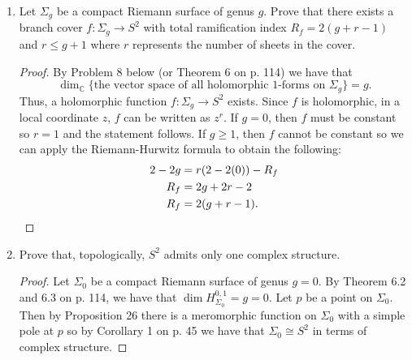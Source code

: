 \documentclass[11pt,oneside,english,reqno]{amsart}
\theoremstyle{definition}
\newcommand{\MB}[1]{\mathbb{#1}}
\begin{document}
\begin{enumerate}[leftmargin=*]
\begin{enumerate}
\item Prove that there exists a nontrivial meromorphic 1-form on $X$.

\begin{proof}
By the result in part (a), we have a meromorphic function $f$ on $X$ and so $\bar\partial f$ is a meromorphic (0,1)-form. By Problem 8 below (Theorem 6 on p. 114), $\bar\partial f$ is a meromorphic 1-form. This must be nontrivial since otherwise $f$ would be trivial and we would have
\[
h=\sum_{i=1}^{g+1}\beta_i\cdot\frac{1}{z}
\]
which is a contradiction since $h$ is smooth.
\end{proof}
\end{enumerate}



\item Let $\Sigma_g$ be a compact Riemann surface of genus $g$. Prove that there exists a branch cover $f:\Sigma_g\to S^2$ with total ramification index $R_f=2(g+r-1)$ and $r\leq g+1$ where $r$ represents the number of sheets in the cover.

\begin{proof}
By Problem 8 below (or Theorem 6 on p. 114) we have that
\[
\dim_\MB{C}\{\text{the vector space of all holomorphic 1-forms on }\Sigma_g\}=g.
\]
Thus, a holomorphic function $f:\Sigma_g\to S^2$ exists. Since $f$ is holomorphic, in a local coordinate $z$, $f$ can be written as $z^r$. If $g=0$, then $f$ must be constant so $r=1$ and the statement follows. If $g\geq1$, then $f$ cannot be constant so we can apply the Riemann-Hurwitz formula to obtain the following:
\begin{align*}
2-2g&=r(2-2(0))-R_f\\
R_f&=2g+2r-2\\
R_f&=2(g+r-1).\qedhere
\end{align*}
\end{proof}



\item Prove that, topologically, $S^2$ admits only one complex structure.

\begin{proof}
Let $\Sigma_0$ be a compact Riemann surface of genus $g=0$. By Theorem 6.2 and 6.3 on p. 114, we have that $\dim H^{0,1}_{\Sigma_0}=g=0$. Let $p$ be a point on $\Sigma_0$. Then by Proposition 26 there is a meromorphic function on $\Sigma_0$ with a simple pole at $p$ so by Corollary 1 on p. 45 we have that $\Sigma_0\cong S^2$ in terms of complex structure.
\end{proof}



\end{enumerate}
\end{document}
